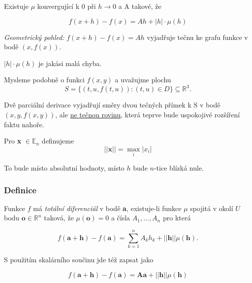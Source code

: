 \documentclass[../main.tex]{subfiles}
\begin{document}
\noindent
\hspace{1.2mm}
Existuje $\mu$ konvergující k 0 při $h \rightarrow 0$ a A takové, že 

\[f(x+h) - f(x) = Ah + |h| \cdot \mu(h)\]

\noindent
\hspace{1.2mm}
\textit{Geometrický pohled:}
$f(x+h) - f(x) = Ah$ vyjadřuje tečnu ke grafu funkce v bodě $(x,f(x)).$

\noindent
\hspace{1.2mm}
$|h|\cdot \mu(h)$ je jakási malá chyba.

\noindent
\hspace{1.2mm}
Mysleme podobně o funkci $f(x,y)$ a uvažujme plochu 
\[S = \{(t,u,f(t,u)) : (t,u) \in D\} \subseteq \mathbb{R}^3.\]

\noindent
\hspace{1.2mm}
Dvě parciální derivace vyjadřují směry dvou tečných přímek k S v bodě $(x,y,f(x,y))$, ale \underline{ne tečnou rovinu}, 
která teprve bude uspokojivé rozšíření faktu nahoře.

\noindent
\hspace{1.2mm}
Pro \textbf{x} $\in \mathbb{E}_n$ definujeme
\[||\textbf{x}||  = \max_i|x_i|\]

\noindent
\hspace{1.2mm}
To bude místo absolutní hodnoty, místo $h$ bude $n$-tice blízká nule.

\subsubsection{Definice}
\hspace{1.2mm}
Funkce $f$ má \textit{totální diferenciál} v bodě \textbf{a}, existuje-li funkce $\mu$ spojitá v okolí $U$ bodu $\textbf{o} \in \mathbb{R}^n$ taková, že $\mu(\textbf{o}) = 0$
a čísla $A_1,...,A_n$ pro která

\[f(\textbf{a}+\textbf{h}) - f(\textbf{a}) = \sum^n_{k=1}A_kh_k+||\textbf{h}||\mu(\textbf{h}).\]

S použitím skalárního součinu jde též zapsat jako

$$f(\textbf{a} + \textbf{h}) - f(\textbf{a}) = \textbf{Aa} + ||\textbf{h}|| \mu (\textbf{h})$$

\end{document}
